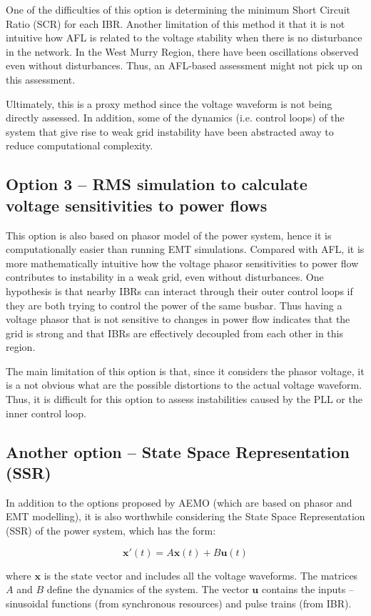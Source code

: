 \documentclass[11pt,a4paper,]{article}
\begin{document}
One of the difficulties of this option is determining the minimum Short Circuit Ratio (SCR) for each IBR. Another limitation of this method it that it is not intuitive how AFL is related to the voltage stability when there is no disturbance in the network. In the West Murry Region, there have been oscillations observed even without disturbances. Thus, an AFL-based assessment might not pick up on this assessment.

Ultimately, this is a proxy method since the voltage waveform is not being directly assessed. In addition, some of the dynamics (i.e. control loops) of the system that give rise to weak grid instability have been abstracted away to reduce computational complexity.

\subsection{Option 3 -- RMS simulation to calculate voltage sensitivities to power flows}
This option is also based on phasor model of the power system, hence it is computationally easier than running EMT simulations. Compared with AFL, it is more mathematically intuitive how the voltage phasor sensitivities to power flow contributes to instability in a weak grid, even without disturbances. One hypothesis \cite{sewdien2020critical} is that nearby IBRs can interact through their outer control loops if they are both trying to control the power of the same busbar. Thus having a voltage phasor that is not sensitive to changes in power flow indicates that the grid is strong and that IBRs are effectively decoupled from each other in this region.

The main limitation of this option is that, since it considers the phasor voltage, it is a not obvious what are the possible distortions to the actual voltage waveform. Thus, it is difficult for this option to assess instabilities caused by the PLL or the inner control loop.

\subsection{Another option -- State Space Representation (SSR)}
In addition to the options proposed by AEMO (which are based on phasor and EMT modelling), it is also worthwhile considering the State Space Representation (SSR) of the power system, which has the form:

$$
\bm{x}'(t) = A\bm{x}(t) + B\bm{u}(t)
$$

where $\bm{x}$ is the state vector and includes all the voltage waveforms. The matrices $A$ and $B$ define the dynamics of the system. The vector $\bm{u}$ contains the inputs -- sinusoidal functions (from synchronous resources) and pulse trains (from IBR).
\end{document}
